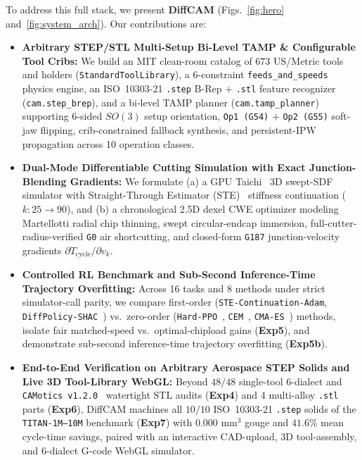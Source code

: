 \documentclass[conference]{IEEEtran}
\begin{document}
To address this full stack, we present \textbf{DiffCAM} (Figs.~\ref{fig:hero} and~\ref{fig:system_arch}). Our contributions are:
\begin{itemize}
  \item \textbf{Arbitrary STEP/STL Multi-Setup Bi-Level TAMP \& Configurable Tool Cribs:} We build an MIT clean-room catalog of $673$ US/Metric tools and holders (\texttt{StandardToolLibrary}), a 6-constraint \texttt{feeds\_and\_speeds} physics engine, an ISO~10303-21 \texttt{.step} B-Rep + \texttt{.stl} feature recognizer (\texttt{cam.step\_brep}), and a bi-level TAMP planner (\texttt{cam.tamp\_planner}) supporting 6-sided $SO(3)$ setup orientation, \texttt{Op1 (G54)} + \texttt{Op2 (G55)} soft-jaw flipping, crib-constrained fallback synthesis, and persistent-IPW propagation across 10 operation classes.
  \item \textbf{Dual-Mode Differentiable Cutting Simulation with Exact Junction-Blending Gradients:} We formulate (a) a GPU Taichi~\cite{hu2020difftaichi} 3D swept-SDF simulator with Straight-Through Estimator (STE)~\cite{bengio2013estimating} stiffness continuation ($k: 25 \to 90$), and (b) a chronological 2.5D dexel CWE optimizer modeling Martellotti radial chip thinning, swept circular-endcap immersion, full-cutter-radius-verified \texttt{G0} air shortcutting, and closed-form \texttt{G187} junction-velocity gradients $\partial T_{\text{cycle}}/\partial v_k$.
  \item \textbf{Controlled RL Benchmark and Sub-Second Inference-Time Trajectory Overfitting:} Across 16 tasks and 8 methods under strict simulator-call parity, we compare first-order (\texttt{STE-Continuation-Adam}, \texttt{DiffPolicy-SHAC}~\cite{xu2022accelerated}) vs.\ zero-order (\texttt{Hard-PPO}~\cite{schulman2017proximal}, \texttt{CEM}~\cite{rubinstein2004cem}, \texttt{CMA-ES}~\cite{hansen2001cmaes}) methods, isolate fair matched-speed vs.\ optimal-chipload gains (\textbf{Exp5}), and demonstrate sub-second inference-time trajectory overfitting (\textbf{Exp5b}).
  \item \textbf{End-to-End Verification on Arbitrary Aerospace STEP Solids and Live 3D Tool-Library WebGL:} Beyond $48/48$ single-tool 6-dialect and \texttt{CAMotics v1.2.0}~\cite{coffland2021camotics} watertight STL audits (\textbf{Exp4}) and 4 multi-alloy \texttt{.stl} parts (\textbf{Exp6}), DiffCAM machines all $10/10$ ISO~10303-21 \texttt{.step} solids of the \texttt{TITAN-1M--10M} benchmark (\textbf{Exp7}) with $0.000\text{ mm}^3$ gouge and $41.6\%$ mean cycle-time savings, paired with an interactive CAD-upload, 3D tool-assembly, and 6-dialect G-code WebGL simulator.
\end{itemize}
\end{document}
